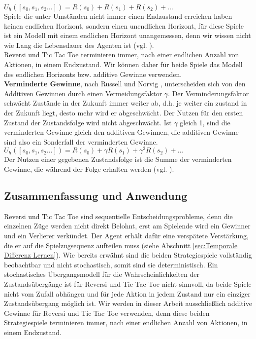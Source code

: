 $U_h([s_0, s_1, s_2 ...]) = R(s_0) + R(s_1) + R(s_2) + ...$ \\

Spiele die unter Umständen nicht immer einen Endzustand erreichen haben keinen endlichen Horizont, sondern einen unendlichen Horizont, für diese Spiele ist ein Modell mit einem endlichen Horizont unangemessen, denn wir wissen nicht wie Lang die Lebensdauer des Agenten ist (vgl. \cite[250]{KLM96}). \\

Reversi und Tic Tac Toe terminieren immer, nach einer endlichen Anzahl von Aktionen, in einem Endzustand. Wir können daher für beide Spiele das Modell des endlichen Horizonts bzw. additive Gewinne verwenden.\\

\textbf{Verminderte Gewinne}, nach Russell und Norvig \cite[756]{Russell}, unterscheiden sich von den Additiven Gewinnen durch einen Vermeidungsfaktor $\gamma$. Der Verminderungsfaktor schwächt Zustände in der Zukunft immer weiter ab, d.h. je weiter ein zustand in der Zukunft liegt, desto mehr wird er abgeschwächt. Der Nutzen für den ersten Zustand der Zustandsfolge wird nicht abgeschwächt. Ist $\gamma$ gleich 1, sind die verminderten Gewinne gleich den additiven Gewinnen, die additiven Gewinne sind also ein Sonderfall der verminderten Gewinne.\\

$U_h([s_0, s_1, s_2 ...]) = R(s_0) + \gamma R(s_1) + \gamma^2 R(s_2) + ...$\\

Der Nutzen einer gegebenen Zustandsfolge ist die Summe der verminderten Gewinne, die während der Folge erhalten werden (vgl. \cite[757]{Russell}). \\

\subsection{Zusammenfassung und Anwendung}
Reversi und Tic Tac Toe sind sequentielle Entscheidungsprobleme, denn die einzelnen Züge werden nicht direkt Belohnt, erst am Spielende wird ein Gewinner und ein Verlierer verkündet. Der Agent erhält dafür eine verspätete Verstärkung, die er auf die Spielzugsequenz aufteilen muss (siehe Abschnitt \ref{sec:Temporale Differenz Lernen}). Wie bereits erwähnt sind die beiden Strategiespiele vollständig beobachtbar und nicht stochastisch, somit sind sie deterministisch. Ein stochastisches Übergangsmodell für die Wahrscheinlichkeiten der Zustandsübergänge ist für Reversi und Tic Tac Toe nicht sinnvoll, da beide Spiele nicht vom Zufall abhängen und für jede Aktion in jedem Zustand nur ein einziger Zustandsübergang möglich ist. Wir werden in dieser Arbeit ausschließlich additive Gewinne für Reversi und Tic Tac Toe verwenden, denn diese beiden Strategiespiele terminieren immer, nach einer endlichen Anzahl von Aktionen, in einem Endzustand. 

